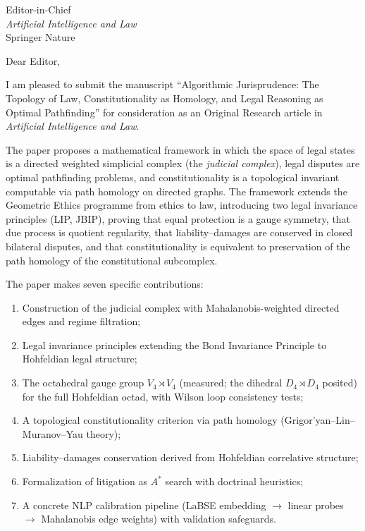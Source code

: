 \documentclass[12pt]{letter}
\begin{document}
\begin{letter}{%
Editor-in-Chief\\
\emph{Artificial Intelligence and Law}\\
Springer Nature}

\opening{Dear Editor,}

I am pleased to submit the manuscript ``Algorithmic Jurisprudence: The Topology of Law, Constitutionality as Homology, and Legal Reasoning as Optimal Pathfinding'' for consideration as an Original Research article in \emph{Artificial Intelligence and Law}.

The paper proposes a mathematical framework in which the space of legal states is a directed weighted simplicial complex (the \emph{judicial complex}), legal disputes are optimal pathfinding problems, and constitutionality is a topological invariant computable via path homology on directed graphs.  The framework extends the Geometric Ethics programme from ethics to law, introducing two legal invariance principles (LIP, JBIP), proving that equal protection is a gauge symmetry, that due process is quotient regularity, that liability--damages are conserved in closed bilateral disputes, and that constitutionality is equivalent to preservation of the path homology of the constitutional subcomplex.

The paper makes seven specific contributions:
\begin{enumerate}
    \item Construction of the judicial complex with Mahalanobis-weighted directed edges and regime filtration;
    \item Legal invariance principles extending the Bond Invariance Principle to Hohfeldian legal structure;
    \item The octahedral gauge group $V_4 \rtimes V_4$ (measured; the dihedral $D_4 \rtimes D_4$ posited) for the full Hohfeldian octad, with Wilson loop consistency tests;
    \item A topological constitutionality criterion via path homology (Grigor'yan--Lin--Muranov--Yau theory);
    \item Liability--damages conservation derived from Hohfeldian correlative structure;
    \item Formalization of litigation as $A^*$ search with doctrinal heuristics;
    \item A concrete NLP calibration pipeline (LaBSE embedding $\to$ linear probes $\to$ Mahalanobis edge weights) with validation safeguards.
\end{enumerate}


\end{letter}
\end{document}
